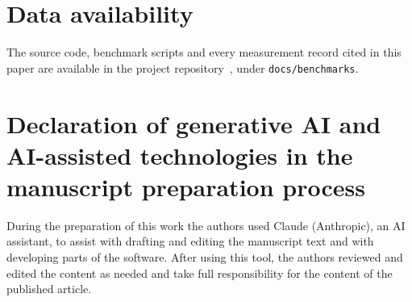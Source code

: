 \documentclass[5p,times,twocolumn]{elsarticle}
\begin{document}
\section*{Data availability}
The source code, benchmark scripts and every measurement record cited in this
paper are available in the project repository~\cite{pipedpeerrepo}, under
\texttt{docs/benchmarks}.

\section*{Declaration of generative AI and AI-assisted technologies in the manuscript preparation process}
During the preparation of this work the authors used Claude (Anthropic), an AI assistant,
to assist with drafting and editing the manuscript text and with
developing parts of the software. After using this tool, the authors reviewed
and edited the content as needed and take full responsibility for the content
of the published article.
\end{document}
